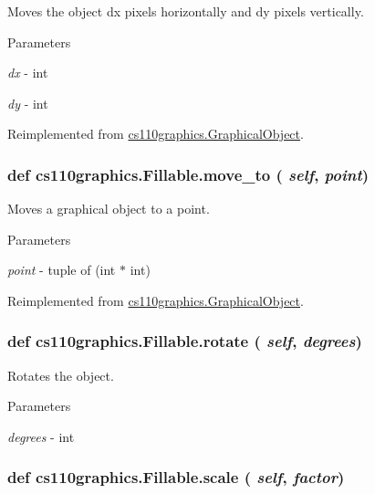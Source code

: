 Moves the object dx pixels horizontally and dy pixels vertically. 
\begin{DoxyParams}{Parameters}
\item[{\em dx}]-\/ int \item[{\em dy}]-\/ int \end{DoxyParams}


Reimplemented from \hyperlink{classcs110graphics_1_1GraphicalObject_aa64d270fb83efa4a54e1a7953512f9cd}{cs110graphics.GraphicalObject}.\hypertarget{classcs110graphics_1_1Fillable_adcabc14e76d1160ff591b9ef7f3d6a97}{
\subsubsection[{move\_\-to}]{\setlength{\rightskip}{0pt plus 5cm}def cs110graphics.Fillable.move\_\-to ( {\em self}, \/   {\em point})}}
\label{classcs110graphics_1_1Fillable_adcabc14e76d1160ff591b9ef7f3d6a97}


Moves a graphical object to a point. 
\begin{DoxyParams}{Parameters}
\item[{\em point}]-\/ tuple of (int $\ast$ int) \end{DoxyParams}


Reimplemented from \hyperlink{classcs110graphics_1_1GraphicalObject_abe2d480265df7ac9447205c52c6946df}{cs110graphics.GraphicalObject}.\hypertarget{classcs110graphics_1_1Fillable_afa6710f6c314de39d19f06d9dd306d7d}{
\subsubsection[{rotate}]{\setlength{\rightskip}{0pt plus 5cm}def cs110graphics.Fillable.rotate ( {\em self}, \/   {\em degrees})}}
\label{classcs110graphics_1_1Fillable_afa6710f6c314de39d19f06d9dd306d7d}


Rotates the object. 
\begin{DoxyParams}{Parameters}
\item[{\em degrees}]-\/ int \end{DoxyParams}
\hypertarget{classcs110graphics_1_1Fillable_a80d5b6b6d2ebae867dccecb803075749}{
\subsubsection[{scale}]{\setlength{\rightskip}{0pt plus 5cm}def cs110graphics.Fillable.scale ( {\em self}, \/   {\em factor})}}
\label{classcs110graphics_1_1Fillable_a80d5b6b6d2ebae867dccecb803075749}


